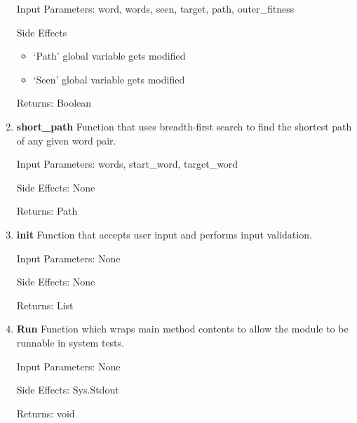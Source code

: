 \documentclass[12pt, a4]{report}
\begin{document}
\begin{enumerate}
			\par Input Parameters: word, words, seen, target, path, outer\_fitness
			\par Side Effects
			\begin{itemize}
				\item `Path' global variable gets modified 
				\item `Seen' global variable gets modified
			\end{itemize}
			\par Returns: Boolean
		\item
			\textbf{short\_path}
			\textbar{} Function that uses breadth-first search to find the shortest path of any given word pair. 
			\par Input Parameters: words, start\_word, target\_word 
			\par Side Effects: None
			\par Returns: Path 
		\item
			\textbf{init}
			\textbar{} Function that accepts user input and performs input validation.   
			\par Input Parameters: None  
			\par Side Effects: None
			\par Returns: List
		\item
		\textbf{Run}
		\textbar{} Function which wraps main method contents to allow the module to be runnable in system tests.
		\par Input Parameters: None  
		\par Side Effects: Sys.Stdout
		\par Returns: void
	

	
	\end{enumerate}
	\newpage
	
\end{document}
